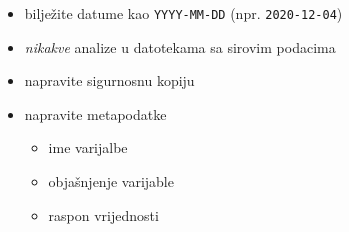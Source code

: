 \documentclass[aspectratio=169]{beamer}
\begin{document}
\begin{frame}
    \begin{itemize}
        \setlength{\itemsep}{2em}

        \item bilježite datume kao \texttt{YYYY-MM-DD} (npr.
            \texttt{2020-12-04})

        \pause

        \item \textit{nikakve} analize u datotekama sa sirovim podacima

        \pause

        \item napravite sigurnosnu kopiju

        \pause

        \item napravite metapodatke

        \begin{itemize}
            \item ime varijalbe

            \item objašnjenje varijable

            \item raspon vrijednosti

        \end{itemize}

    \end{itemize}
\end{frame}
\end{document}
